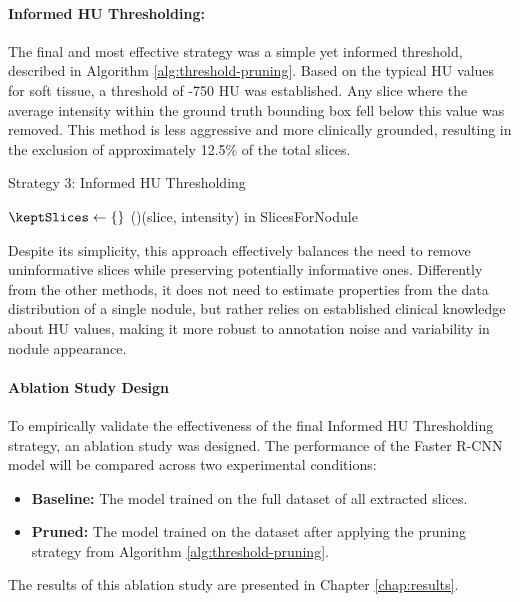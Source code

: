 \paragraph{Informed HU Thresholding:} The final and most effective strategy was a simple yet informed threshold, described in Algorithm \ref{alg:threshold-pruning}. Based on the typical HU values for soft tissue, a threshold of -750 HU was established. Any slice where the average intensity within the ground truth bounding box fell below this value was removed. This method is less aggressive and more clinically grounded, resulting in the exclusion of approximately 12.5\% of the total slices.

\begin{algorithm}[H]
    \caption{Strategy 3: Informed HU Thresholding}
    \label{alg:threshold-pruning}
    \DontPrintSemicolon
    \SetAlgoLined

    
    \BlankLine
    
    $\keptSlices \gets \{\}$\;
    \ForAll(){(slice, intensity) \textup{in} SlicesForNodule}{
    }
    \Return{$\keptSlices$}\;
\end{algorithm}

Despite its simplicity, this approach effectively balances the need to remove uninformative slices while preserving potentially informative ones.
Differently from the other methods, it does not need to estimate properties from the data distribution of a single nodule, but rather relies on established clinical knowledge about HU values, making it more robust to annotation noise and variability in nodule appearance.

\paragraph{Ablation Study Design}
To empirically validate the effectiveness of the final Informed HU Thresholding strategy, an ablation study was designed. The performance of the Faster R-CNN model will be compared across two experimental conditions:
\begin{itemize}
    \item \textbf{Baseline:} The model trained on the full dataset of all extracted slices.
    \item \textbf{Pruned:} The model trained on the dataset after applying the pruning strategy from Algorithm \ref{alg:threshold-pruning}.
\end{itemize}
The results of this ablation study are presented in Chapter \ref{chap:results}.




